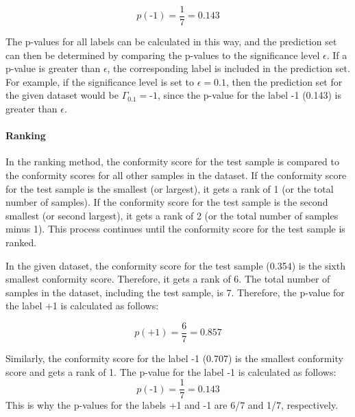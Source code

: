 $$ p(\text{-1}) = \frac{1}{7} = 0.143 $$

The p-values for all labels can be calculated in this way, and the prediction set can then be determined by comparing the p-values to the significance level $\epsilon$. If a p-value is greater than $\epsilon$, the corresponding label is included in the prediction set. For example, if the significance level is set to $\epsilon = 0.1$, then the prediction set for the given dataset would be $\Gamma_{0.1} = {\text{-1}}$, since the p-value for the label -1 (0.143) is greater than $\epsilon$.

\paragraph{Ranking}
In the ranking method, the conformity score for the test sample is compared to the conformity scores for all other samples in the dataset. If the conformity score for the test sample is the smallest (or largest), it gets a rank of 1 (or the total number of samples). If the conformity score for the test sample is the second smallest (or second largest), it gets a rank of 2 (or the total number of samples minus 1). This process continues until the conformity score for the test sample is ranked.

In the given dataset, the conformity score for the test sample (0.354) is the sixth smallest conformity score. Therefore, it gets a rank of 6. The total number of samples in the dataset, including the test sample, is 7. Therefore, the p-value for the label +1 is calculated as follows:

$$ p(\text{+1}) = \frac{6}{7} = 0.857 $$

Similarly, the conformity score for the label -1 (0.707) is the smallest conformity score and gets a rank of 1. The p-value for the label -1 is calculated as follows:
$$ p(\text{-1}) = \frac{1}{7} = 0.143 $$
This is why the p-values for the labels +1 and -1 are 6/7 and 1/7, respectively.
